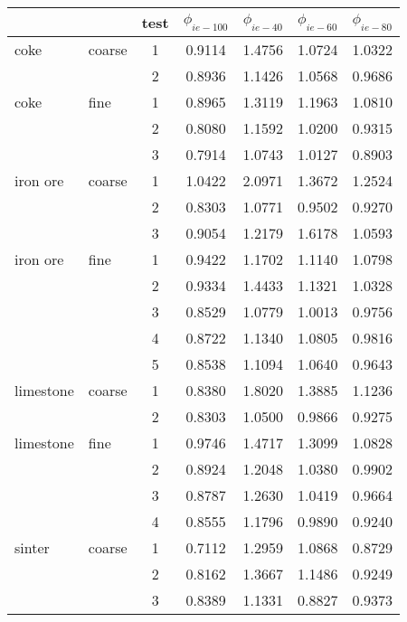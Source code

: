 \begin{table}%
\centering
\begin{tabular}{ll|c|cccc}
\hline
          &       & test  & $\phi_{ie-100}$ & $\phi_{ie-40}$ & $\phi_{ie-60}$ &
          $\phi_{ie-80}$ \\
\hline          
    coke  & coarse & 1     & 0.9114 & 1.4756 & 1.0724 & 1.0322 \\
          &       & 2     & 0.8936 & 1.1426 & 1.0568 & 0.9686 \\
\hline     
    coke  & fine  & 1     & 0.8965 & 1.3119 & 1.1963 & 1.0810 \\
          &       & 2     & 0.8080 & 1.1592 & 1.0200 & 0.9315 \\
          &       & 3     & 0.7914 & 1.0743 & 1.0127 & 0.8903 \\
\hline 
    iron ore & coarse & 1     & 1.0422 & 2.0971 & 1.3672 & 1.2524 \\
          &       & 2     & 0.8303 & 1.0771 & 0.9502 & 0.9270 \\
          &       & 3     & 0.9054 & 1.2179 & 1.6178 & 1.0593 \\
\hline 
    iron ore & fine  & 1     & 0.9422 & 1.1702 & 1.1140 & 1.0798 \\
          &       & 2     & 0.9334 & 1.4433 & 1.1321 & 1.0328 \\
          &       & 3     & 0.8529 & 1.0779 & 1.0013 & 0.9756 \\
          &       & 4     & 0.8722 & 1.1340 & 1.0805 & 0.9816 \\
          &       & 5     & 0.8538 & 1.1094 & 1.0640 & 0.9643 \\
\hline 
    limestone & coarse & 1     & 0.8380 & 1.8020 & 1.3885 & 1.1236 \\
          &       & 2     & 0.8303 & 1.0500 & 0.9866 & 0.9275 \\
\hline 
    limestone & fine  & 1     & 0.9746 & 1.4717 & 1.3099 & 1.0828 \\
          &       & 2     & 0.8924 & 1.2048 & 1.0380 & 0.9902 \\
          &       & 3     & 0.8787 & 1.2630 & 1.0419 & 0.9664 \\
          &       & 4     & 0.8555 & 1.1796 & 0.9890 & 0.9240 \\
\hline 
    sinter & coarse & 1     & 0.7112 & 1.2959 & 1.0868 & 0.8729 \\
          &       & 2     & 0.8162 & 1.3667 & 1.1486 & 0.9249 \\
          &       & 3     & 0.8389 & 1.1331 & 0.8827 & 0.9373 \\

\end{tabular}
\end{table}
